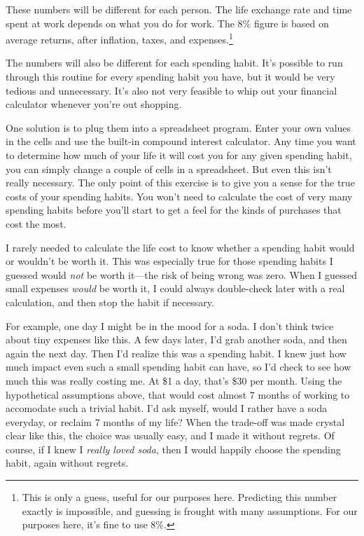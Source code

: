These numbers will be different for each person. The life exchange rate and time spent at work depends on what you do for work. The 8\% figure is based on average returns, after inflation, taxes, and expenses.\footnote{This is only a guess, useful for our purposes here. Predicting this number exactly is impossible, and guessing is frought with many assumptions. For our purposes here, it's fine to use 8\%.}

The numbers will also be different for each spending habit. It's possible to run through this routine for every spending habit you have, but it would be very tedious and unnecessary. It's also not very feasible to whip out your financial calculator whenever you're out shopping.

One solution is to plug them into a spreadsheet program. Enter your own values in the cells and use the built-in compound interest calculator. Any time you want to determine how much of your life it will cost you for any given spending habit, you can simply change a couple of cells in a spreadsheet. But even this isn't really necessary. The only point of this exercise is to give you a sense for the true costs of your spending habits. You won't need to calculate the cost of very many spending habits before you'll start to get a feel for the kinds of purchases that cost the most.

I rarely needed to calculate the life cost to know whether a spending habit would or wouldn't be worth it. This was especially true for those spending habits I guessed would \emph{not} be worth it---the risk of being wrong was zero. When I guessed small expenses \emph{would} be worth it, I could always double-check later with a real calculation, and then stop the habit if necessary.

For example, one day I might be in the mood for a soda. I don't think twice about tiny expenses like this. A few days later, I'd grab another soda, and then again the next day. Then I'd realize this was a spending habit. I knew just how much impact even such a small spending habit can have, so I'd check to see how much this was really costing me. At \$1 a day, that's \$30 per month. Using the hypothetical assumptions above, that would cost almost 7 months of working to accomodate such a trivial habit. I'd ask myself, would I rather have a soda everyday, or reclaim 7 months of my life? When the trade-off was made crystal clear like this, the choice was usually easy, and I made it without regrets. Of course, if I knew I \emph{really loved soda}, then I would happily choose the spending habit, again without regrets.

